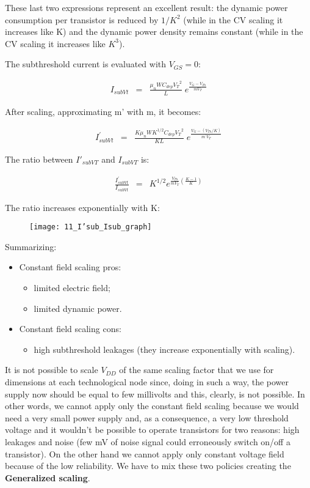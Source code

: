 \documentclass[a4paper, 12pt, twoside, openright]{report}
\begin{document}
These last two expressions represent an excellent result: the dynamic power consumption per transistor is reduced by $1/K^{2}$ (while in the CV scaling it increases like K) and the dynamic power density remains constant (while in the CV scaling it increases like $K^{3}$).



The subthreshold current is evaluated with $V_{GS} = 0$:

	\begin{eqnarray*}
	I_{subVt} & = &\frac{\mu_n W C_{dep} {V_T}^2}{L}\;e^{\displaystyle \frac{ {V_G-V_{Th}}}{ mV_T}}
	\end{eqnarray*}

After scaling, approximating m' with m, it becomes:

	\begin{eqnarray*}
	I_{subVt}^{\prime} & = &\frac{K \mu_n W K^{1/2} C_{dep} {V_T}^2}{K L}\;e^{\displaystyle \frac{ {V_G-(V_{Th}/K)}}{ m^{\prime}V_T}}
	\end{eqnarray*}

The ratio between $I'_{subVT}$ and $I_{subVT}$ is:

	\begin{eqnarray*}
	\frac{I_{subVt}^{\prime}}{I_{subVt}} & =& K^{1/2} e^{\frac{V_{Th}}{mV_T}\left( \frac{K-1}{K}\right)}
	\end{eqnarray*}

The ratio increases exponentially with K:

	\begin{figure}[H]
	\centering
	\texttt{[image: 11\_I'sub\_Isub\_graph]}
	\caption{}
	\label{}
	\end{figure}

Summarizing:

\begin{itemize}
\item Constant field scaling pros:
	\begin{itemize}
	\item limited electric field;
	\item limited dynamic power.
	\end{itemize}
\item Constant field scaling cons:
	\begin{itemize}
	\item high subthreshold leakages (they increase exponentially with scaling).
	\end{itemize}
\end{itemize}

It is not possible to scale $V_{DD}$ of the same scaling factor that we use for dimensions at each technological node since, doing in such a way, the power supply now should be equal to few millivolts and this, clearly, is not possible. In other words, we cannot apply only the constant field scaling because we would need a very small power supply and, as a consequence, a very low threshold voltage and it wouldn't be possible to operate transistors for two reasons: high leakages and noise (few mV of noise signal could erroneously switch on/off a transistor). On the other hand we cannot apply only constant voltage field because of the low reliability. We have to mix these two policies creating the \textbf{Generalized scaling}.
\end{document}
